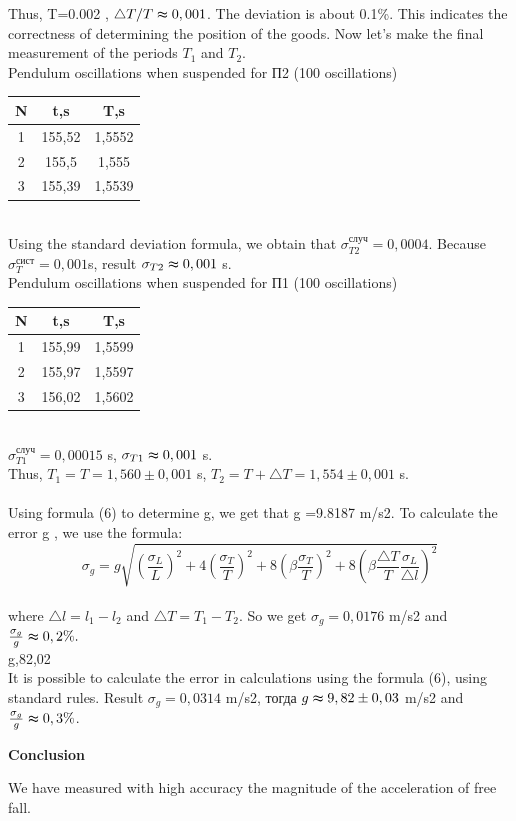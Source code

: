 \documentclass[12pt]{article}
\begin{document}
Thus, \triangle T=0.002 ,\; $\triangle T/T \thickapprox 0,001 $. The deviation is about 0.1\%. This indicates the correctness of determining the position of the goods. Now let's make the final measurement of the periods $T_{1}$ and $T_{2}$.\\

Pendulum oscillations when suspended for П2 (100 oscillations)\\

\begin{tabular}{c|c|c}
N & t,s & T,s\\
\hline
 1 & 155,52 & 1,5552\\
 2 & 155,5 & 1,555\\
 3 & 155,39 & 1,5539\\
\end{tabular}\\

Using the standard deviation formula, we obtain that $\sigma_{T2}^{\text{случ}}=0,0004$. Because $\sigma_{T}^{\text{сист}}=0,001$s, result $\sigma_{T2}\thickapprox 0,001$ s.\\

Pendulum oscillations when suspended for П1 (100 oscillations)\\

\begin{tabular}{c|c|c}
N & t,s & T,s\\
\hline
 1 & 155,99 & 1,5599\\
 2 & 155,97 & 1,5597\\
 3 & 156,02 & 1,5602\\
\end{tabular}\\

$\sigma_{T1}^{\text{случ}}=0,00015$ s, $\sigma_{T1}\thickapprox 0,001$ s.\\

Thus, $T_{1}=T=1,560\pm 0,001$ s, $T_{2}=T+\triangle T= 1,554\pm 0,001$ s.\\

\textbf{\large {}}\\

Using formula (6) to determine g, we get that g =9.8187 m/s2. To calculate the error g , we use the formula:
$$\sigma_{g} =g\sqrt{(\frac{\sigma_{L}}{L})^2+4(\frac{\sigma_{T}}{T})^2+8(\beta\frac{\sigma_{T}}{T})^2+8(\beta\frac{\triangle T}{T}\frac{\sigma_{L}}{\triangle l})^2} $$\\
where $\triangle l=l_{1}-l_{2}$ and $\triangle T=T_{1}-T_{2}$. So we get $\sigma_{g} = 0,0176$ m/s2 and \large $\frac{\sigma_{g}}{g}  \thickapprox 0,2\%.$\\

g,82,02\;  \\

It is possible to calculate the error in calculations using the formula (6), using standard rules. Result $\sigma_{g} = 0,0314$ m/s2, тогда $g\thickapprox9,82\pm0,03$ m/s2 and $\frac{\sigma_{g}}{g}\thickapprox0,3\%$.

\textbf{\large Conclusion}

We have measured with high accuracy the magnitude of the acceleration of free fall.
\end{document}
